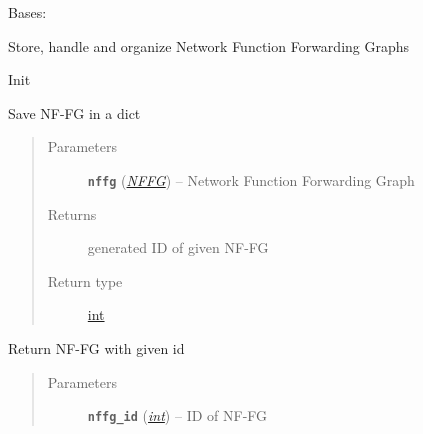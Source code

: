 \documentclass[letterpaper,10pt,english]{sphinxmanual}
\begin{document}

\begin{fulllineitems}
\label{orchest/ros_orchestration:escape.orchest.ros_orchestration.NFFGManager}
Bases: \href{https://docs.python.org/2.7/library/functions.html\#object}{}

Store, handle and organize Network Function Forwarding Graphs

\begin{fulllineitems}
\label{orchest/ros_orchestration:escape.orchest.ros_orchestration.NFFGManager.__init__}
Init

\end{fulllineitems}


\begin{fulllineitems}
\label{orchest/ros_orchestration:escape.orchest.ros_orchestration.NFFGManager.save}
Save NF-FG in a dict
\begin{quote}\begin{description}
\item[{Parameters}] \leavevmode
\textbf{\texttt{nffg}} ({\hyperref[util/nffg:escape.util.nffg.NFFG]{\emph{\emph{NFFG}}}}) -- Network Function Forwarding Graph

\item[{Returns}] \leavevmode
generated ID of given NF-FG

\item[{Return type}] \leavevmode
\href{https://docs.python.org/2.7/library/functions.html\#int}{int}

\end{description}\end{quote}

\end{fulllineitems}


\begin{fulllineitems}
\label{orchest/ros_orchestration:escape.orchest.ros_orchestration.NFFGManager.get}
Return NF-FG with given id
\begin{quote}\begin{description}
\item[{Parameters}] \leavevmode
\textbf{\texttt{nffg\_id}} (\href{https://docs.python.org/2.7/library/functions.html\#int}{\emph{int}}) -- ID of NF-FG


\end{description}
\end{quote}
\end{fulllineitems}
\end{fulllineitems}
\end{document}
